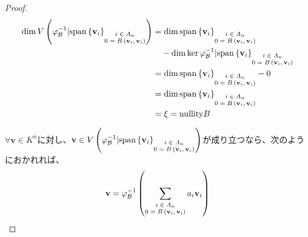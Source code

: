 \documentclass[dvipdfmx]{jsarticle}
\begin{document}
\begin{proof}
\begin{align*}
\dim{V\left( \varphi_{\mathcal{B}}^{- 1}|{\mathrm{span}}\left\{ \mathbf{v}_{i} \right\}_{\scriptsize \begin{matrix} i \in \varLambda_{n} \\0 = B\left( \mathbf{v}_{i},\mathbf{v}_{i} \right) \end{matrix}} \right)} &= \dim{{\mathrm{span}}\left\{ \mathbf{v}_{i} \right\}_{\scriptsize \begin{matrix} i \in \varLambda_{n} \\0 = B\left( \mathbf{v}_{i},\mathbf{v}_{i} \right) \end{matrix}}} \\
&\quad - \dim{\ker{\varphi_{\mathcal{B}}^{- 1}|{\mathrm{span}}\left\{ \mathbf{v}_{i} \right\}_{\scriptsize \begin{matrix} i \in \varLambda_{n} \\0 = B\left( \mathbf{v}_{i},\mathbf{v}_{i} \right) \end{matrix}}}}\\
&= \dim{{\mathrm{span}}\left\{ \mathbf{v}_{i} \right\}_{\scriptsize \begin{matrix} i \in \varLambda_{n} \\0 = B\left( \mathbf{v}_{i},\mathbf{v}_{i} \right) \end{matrix}}} - 0\\
&= \dim{{\mathrm{span}}\left\{ \mathbf{v}_{i} \right\}_{\scriptsize \begin{matrix} i \in \varLambda_{n} \\0 = B\left( \mathbf{v}_{i},\mathbf{v}_{i} \right) \end{matrix}}}\\
&= \xi = {\mathrm{nullity}}B
\end{align*}\par
$\forall\mathbf{v} \in K^{n}$に対し、$\mathbf{v} \in V\left( \varphi_{\mathcal{B}}^{- 1}|{\mathrm{span}}\left\{ \mathbf{v}_{i} \right\}_{\scriptsize \begin{matrix} i \in \varLambda_{n} \\0 = B\left( \mathbf{v}_{i},\mathbf{v}_{i} \right) \end{matrix}} \right)$が成り立つなら、次のようにおかれれば、
\begin{align*}
\mathbf{v} = \varphi_{\mathcal{B}}^{- 1}\left( \sum_{\scriptsize \begin{matrix} i \in \varLambda_{n} \\0 = B\left( \mathbf{v}_{i},\mathbf{v}_{i} \right) \end{matrix}} {a_{i}\mathbf{v}_{i}} \right)

\end{align*}
\end{proof}
\end{document}
